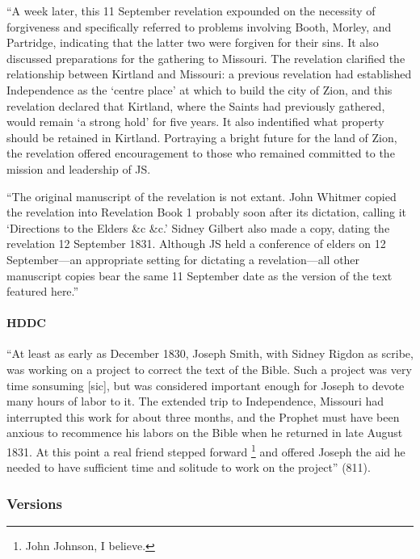 			``A week later, this 11 September revelation expounded on the necessity of forgiveness and specifically referred to problems involving Booth, Morley, and Partridge, indicating that the latter two were forgiven for their sins. It also discussed preparations for the gathering to Missouri. The revelation clarified the relationship between Kirtland and Missouri: a previous revelation had established Independence as the `centre place' at which to build the city of Zion, and this revelation declared that Kirtland, where the Saints had previously gathered, would remain `a strong hold' for five years. It also indentified what property should be retained in Kirtland. Portraying a bright future for the land of Zion, the revelation offered encouragement to those who remained committed to the mission and leadership of JS.
			
			``The original manuscript of the revelation is not extant. John Whitmer copied the revelation into Revelation Book 1 probably soon after its dictation, calling it `Directions to the Elders \&c \&c.' Sidney Gilbert also made a copy, dating the revelation 12 September 1831. Although JS held a conference of elders on 12 September---an appropriate setting for dictating a revelation---all other manuscript copies bear the same 11 September date as the version of the text featured here.''
			
		\paragraph{HDDC}
		
			``At least as early as December 1830, Joseph Smith, with Sidney Rigdon as scribe, was working on a project to correct the text of the Bible. Such a project was very time sonsuming [sic], but was considered important enough for Joseph to devote many hours of labor to it. The extended trip to Independence, Missouri had interrupted this work for about three months, and the Prophet must have been anxious to recommence his labors on the Bible when he returned in late August 1831. At this point a real friend stepped forward%
				\footnote{%
					John Johnson, I believe.
					}
			and offered Joseph the aid he needed to have sufficient time and solitude to work on the project'' (811).
		
	\subsubsection{Versions}
		\label{DC64-V}
		
